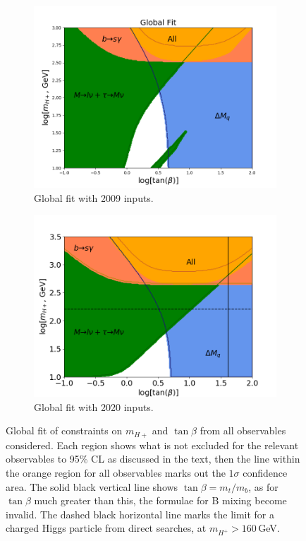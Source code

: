 \documentclass[a4paper,12pt]{article}
\begin{document}
\begin{figure}[ht]
    \centering
    \begin{subfigure}[b]{0.48\textwidth}
        \includegraphics[width=\textwidth]{global_08.png}
        \caption{\label{subfig:glob08}Global fit with 2009 inputs.}
    \end{subfigure}
    \begin{subfigure}[b]{0.48\textwidth}
        \includegraphics[width=\textwidth]{../global/global_test_min.png}
        \caption{\label{subfig:glob11}Global fit with 2020 inputs.}
    \end{subfigure}
    \caption{\label{fig:glob1} Global fit of constraints on $m_{H+}$ and $\tan\beta$ from all observables considered. 
    Each region shows what is not excluded for the relevant observables to 95\% CL as discussed in the text, then the line within the orange region for all observables marks out the $1\sigma$ confidence area. 
    The solid black vertical line shows $\tan\beta=m_t/m_b$, as for $\tan\beta$ much greater than this, the formulae for B mixing become invalid. 
    The dashed black horizontal line marks the limit for a charged Higgs particle from direct searches, at $m_{H^+}>160\,$GeV.}
\end{figure}
\end{document}
